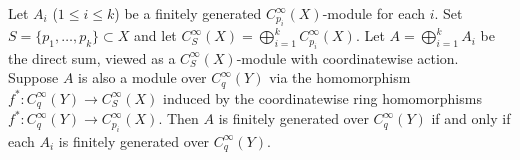 %

\begin{lemma}
Let $A_i$ ($1 \leq i \leq k$) be a finitely generated $C_{p_i}^\infty(X)$-module for each $i$.
Set $S = \{p_1,\ldots,p_k\} \subset X$ and let $C_S^\infty(X) = \bigoplus_{i=1}^{k} C_{p_i}^\infty(X)$.
Let $A = \bigoplus_{i=1}^{k} A_i$ be the direct sum, viewed as a $C_S^\infty(X)$-module with coordinatewise action.
Suppose $A$ is also a module over $C_q^\infty(Y)$ via the homomorphism $f^*: C_q^\infty(Y) \to C_S^\infty(X)$ induced by the coordinatewise ring homomorphisms $f^*: C_q^\infty(Y) \to C_{p_i}^\infty(X)$.
Then $A$ is finitely generated over $C_q^\infty(Y)$ if and only if each $A_i$ is finitely generated over $C_q^\infty(Y)$.
\end{lemma}
